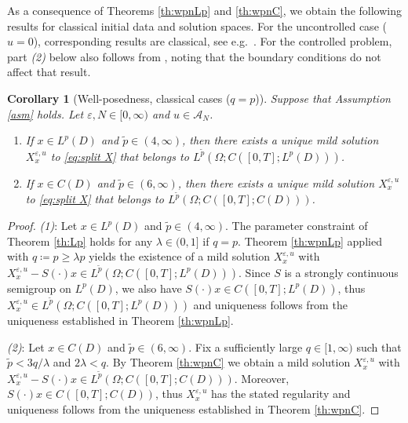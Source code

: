 \documentclass[10pt,a4paper]{amsart}
\newtheorem{corollary}[theorem]{Corollary}
\numberwithin{equation}{section}
\newcommand{\ceqq}{\coloneqq}
\newcommand{\eps}{\varepsilon}
\newcommand{\Om}{\Omega}
\newcommand{\A}{{\mathcal A}}
\begin{document}
As a consequence of Theorems \ref{th:wpnLp} and \ref{th:wpnC}, we obtain the following results for classical initial data and solution spaces.  For the uncontrolled case ($u=0$), corresponding results are classical, see e.g.\  \cite{daprato}. For the controlled problem,  part \textit{(2)} below   also follows from \cite[Th.\ 7.1]{Salins21reacdiff}, noting that the boundary conditions do not affect that result.  


 
\begin{corollary}[Well-posedness, classical cases ($q=p$)]\label{cor:wpn classical} 
Suppose that Assumption \ref{asm} holds. Let $\eps,N \in[ 0,\infty)$  and $u\in \A_N$.  
\begin{enumerate}
\item  If $x\in L^p(D)$ and $\tilde p\in(4,\infty)$, then there exists a unique mild solution $X_x^{\eps,u}$ to \eqref{eq:split X} that belongs to $L^{\tilde p}(\Om;C([0,T]; L^p(D)))$. 
\item If $x\in C(D)$ and $\tilde p\in(6,\infty)$, then there exists a unique mild solution $X_x^{\eps,u}$ to \eqref{eq:split X} that belongs to $L^{\tilde p}(\Om;C([0,T];C(D)))$. 
\end{enumerate}
\end{corollary}

\begin{proof}
\textit{(1)}: Let $x\in L^p(D)$ and $\tilde p\in(4,\infty)$. The parameter constraint of Theorem \ref{th:Lp} holds for any $\lambda\in(0,1]$ if $q=p$.  Theorem \ref{th:wpnLp} applied with $q\ceqq p\geq\lambda p$ yields the existence of a mild solution $X_x^{\eps,u}$  with $X_x^{\eps,u}-S(\cdot)x\in L^{\tilde p}(\Om;C([0,T]; L^p(D)))$. Since $S$ is a strongly continuous semigroup on $L^p(D)$, we also have $S(\cdot)x\in C([0,T];L^p(D))$, thus $X_x^{\eps,u} \in L^{\tilde p}(\Om;C([0,T]; L^p(D)))$ and uniqueness follows from the  uniqueness  established in Theorem \ref{th:wpnLp}. 

\textit{(2)}: Let $x\in C(D)$ and $\tilde p\in(6,\infty)$. Fix a sufficiently large $q\in[1,\infty)$ such that $\tilde p<3q/\lambda$ and $2\lambda<q$.  
By Theorem \ref{th:wpnC}  we obtain a mild solution $X_x^{\eps,u}$ with $X_x^{\eps,u}-S(\cdot)x\in L^{\tilde p}(\Om;C([0,T];C(D)))$. Moreover, $S(\cdot)x\in C([0,T];C(D))$, thus $X_x^{\eps,u}$ has the stated regularity and uniqueness follows from the uniqueness established in Theorem \ref{th:wpnC}. 
\end{proof} 
\end{document}
